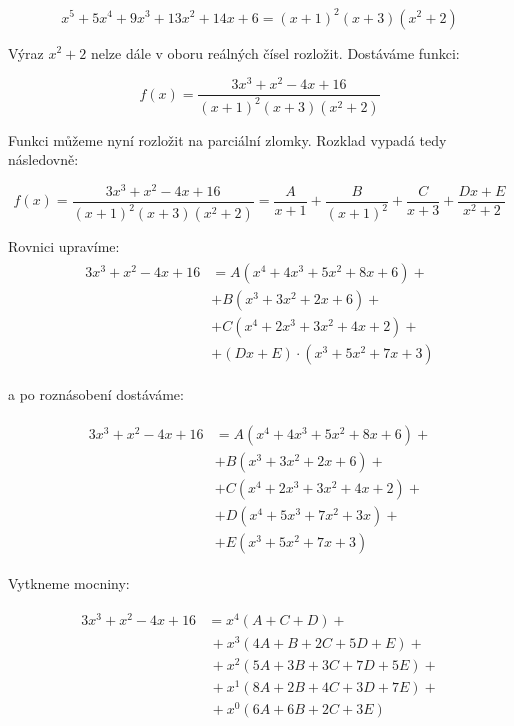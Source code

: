\begin{displaymath}
	x^5+5x^4+9x^3+13x^2+14x+6 = (x+1)^2(x+3)(x^2+2)
\end{displaymath}

Výraz $x^2+2$ nelze dále v oboru reálných čísel rozložit. Dostáváme funkci:

\begin{displaymath}
f(x)=\frac{3x^3+x^2-4x+16}{(x+1)^2(x+3)(x^2+2)}
\end{displaymath}

Funkci můžeme nyní rozložit na parciální zlomky. Rozklad vypadá tedy následovně:

\begin{displaymath}
f(x)=\frac{3x^3+x^2-4x+16}{(x+1)^2(x+3)(x^2+2)}
=
\frac{A}{x+1} +
\frac{B}{(x+1)^2} +
\frac{C}{x+3} +
\frac{Dx+E}{x^2+2}
\end{displaymath}

Rovnici upravíme:
\begin{gather*}
\begin{aligned}
3x^3+x^2-4x+16 &= 
 A(x^4+4x^3+5x^2+8x+6) + \\
& + B(x^3+3x^2+2x+6) + \\
& + C(x^4+2x^3+3x^2+4x+2) +\\
& + (Dx+E)\cdot(x^3+5x^2+7x+3)
\end{aligned}
\end{gather*}

a po roznásobení dostáváme:

\begin{gather*}
 \begin{aligned}
3x^3 + x^2 - 4x + 16 &
  = A(x^4 + 4x^3+5x^2+8x+6) + \\
& + B (x^3+3x^2+2x+6) + \\
& + C (x^4+2x^3+3x^2+4x+2) + \\
& + D (x^4+5x^3+7x^2+3x) + \\
& + E (x^3+5x^2+7x+3)
	\end{aligned}
\end{gather*}

Vytkneme mocniny:

\begin{gather*}
\begin{aligned}
3x^3+x^2-4x+16 &
 = x^4(A+C+D) + \\
& \,+ x^3(4A+B+2C+5D+E) + \\
& \,+ x^2(5A+3B+3C+7D+5E) + \\
& \,+ x^1(8A+2B+4C+3D+7E) + \\
& \,+ x^0(6A+6B+2C+3E) 
\end{aligned}
\end{gather*}

